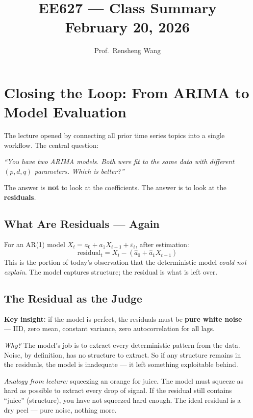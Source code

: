 \documentclass[11pt]{article}
\title{\textbf{EE627 --- Class Summary}\\[0.4em]
       \large February 20, 2026}
\author{Prof.\ Rensheng Wang}
\date{}
\begin{document}
\maketitle
\tableofcontents
\newpage

\section{Closing the Loop: From ARIMA to Model Evaluation}

The lecture opened by connecting all prior time series topics into a single
workflow. The central question:

\textit{``You have two ARIMA models. Both were fit to the same data with
different $(p,d,q)$ parameters. Which is better?''}

The answer is \textbf{not} to look at the coefficients. The answer is to
look at the \textbf{residuals}.

\subsection{What Are Residuals --- Again}
For an AR(1) model $X_t = a_0 + a_1 X_{t-1} + \varepsilon_t$, after
estimation:
\[
\text{residual}_t = X_t - \left(\hat{a}_0 + \hat{a}_1 X_{t-1}\right)
\]
This is the portion of today's observation that the deterministic model
\emph{could not explain}. The model captures structure; the residual is
what is left over.

\subsection{The Residual as the Judge}
\textbf{Key insight:} if the model is perfect, the residuals must be
\textbf{pure white noise} --- IID, zero mean, constant variance, zero
autocorrelation for all lags.

\textit{Why?} The model's job is to extract every deterministic pattern
from the data. Noise, by definition, has no structure to extract. So if
any structure remains in the residuals, the model is inadequate --- it left
something exploitable behind.

\textit{Analogy from lecture:} squeezing an orange for juice. The model
must squeeze as hard as possible to extract every drop of signal. If the
residual still contains ``juice'' (structure), you have not squeezed hard
enough. The ideal residual is a dry peel --- pure noise, nothing more.
\end{document}
